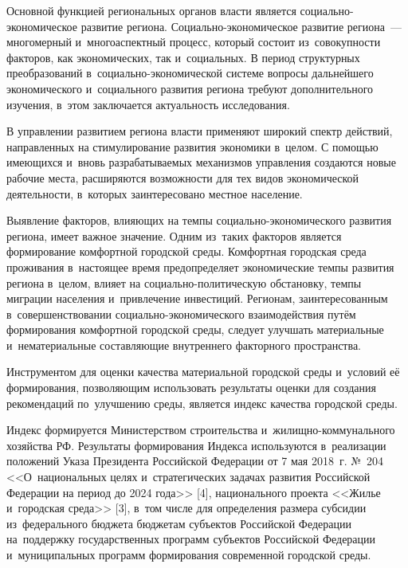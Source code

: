 



\makeProcTitle
{}

Основной функцией региональных органов власти является социально-экономическое развитие региона. Социально-экономическое развитие региона~--- многомерный и~многоаспектный процесс, который состоит из~совокупности факторов, как экономических, так и~социальных. В период структурных преобразований в~социально-экономической системе вопросы дальнейшего экономического и~социального развития региона требуют дополнительного изучения, в~этом заключается актуальность исследования.

В управлении развитием региона власти применяют широкий спектр действий, направленных на стимулирование развития экономики в~целом. С помощью имеющихся и~вновь разрабатываемых механизмов управления создаются новые рабочие места, расширяются возможности для тех видов экономической деятельности, в~которых заинтересовано местное население.

Выявление факторов, влияющих на темпы социально-экономического развития региона, имеет важное значение. Одним из~таких факторов является формирование комфортной городской среды. Комфортная городская среда проживания в~настоящее время предопределяет экономические темпы развития региона в~целом, влияет на социально-политическую обстановку, темпы миграции населения и~привлечение инвестиций. Регионам, заинтересованным в~совершенствовании социально-экономического взаимодействия путём формирования комфортной городской среды, следует улучшать материальные и~нематериальные составляющие внутреннего факторного пространства.

Инструментом для оценки качества материальной городской среды и~ус\-ло\-вий её формирования, позволяющим использовать результаты оценки для создания рекомендаций по~улучшению среды, является индекс качества городской среды.

Индекс формируется Министерством строительства и жилищно-ком\-му\-наль\-но\-го хозяйства РФ. Результаты формирования Индекса используются в реализации положений Указа Президента Российской Федерации от 7 мая 2018~г. №~204 <<О национальных целях и стратегических задачах развития Российской Федерации на период до 2024 года>> [4], национального проекта <<Жилье и городская среда>> [3], в том числе для определения размера субсидии из~федерального бюджета бюджетам субъектов Российской Федерации на~поддержку государственных программ субъектов Российской Федерации и~муниципальных программ формирования современной городской среды.

